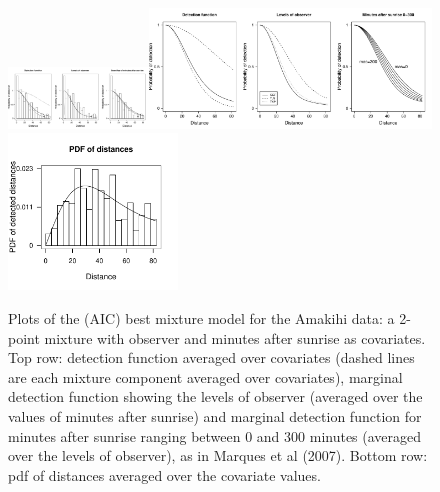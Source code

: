 \documentclass[10pt]{article}
\begin{document}
\begin{figure}[H]
\centering
\includegraphics[width=0.3333\textwidth, trim=0 0 7.133334in 0, clip=true]{analyses/amakihi-om.pdf}\includegraphics[width=0.6666\textwidth, trim=3.566667in 0 0 0, clip=true]{analyses/amakihi-om-hh.pdf}\\
\includegraphics[width=0.4\textwidth]{analyses/amakihi-om-pdf.pdf}
\caption{Plots of the (AIC) best mixture model for the Amakihi data: a 2-point mixture with observer and minutes after sunrise as covariates. Top row: detection function averaged over covariates (dashed lines are each mixture component averaged over covariates), marginal detection function showing the levels of observer (averaged over the values of minutes after sunrise) and marginal detection function for minutes after sunrise ranging between 0 and 300 minutes (averaged over the levels of observer), as in Marques et al (2007). Bottom row: pdf of distances averaged over the covariate values.}
\label{amakihi}
\end{figure}



\end{document}
